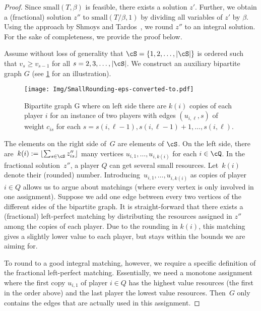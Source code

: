 \documentclass[a4paper,USenglish,cleveref,thm-restate]{lipics-v2021}
\begin{document}
\begin{proof}
    Since $\mathrm{small}(T, \beta)$ is feasible, there exists a solution $z'$.
    Further, we obtain a (fractional) solution $z''$ to $\mathrm{small}(T/\beta, 1)$ 
    by dividing all variables of $z'$ by $\beta$.
    Using the approach by Shmoys and Tardos~\cite{ShmoysT93},
    we round $z''$ to an integral solution.
    For the sake of completeness, we provide the proof below.

    Assume without loss of generality that $\cS = \{1,2,\dotsc,|\cS|\}$ is ordered such that $v_s \ge v_{s-1}$ for all $s=2,3,\dotsc,|\cS|$.
    We construct an auxiliary bipartite graph $G$ (see \cref{fig:smallRounding} for an illustration).
    \begin{figure}
        \centering
        \texttt{[image: Img/SmallRounding-eps-converted-to.pdf]}
        \caption{Bipartite graph G where on left side there are $k(i)$ copies of each player $i$ for an instance of two players with edges $(u_{i,\ell}, s)$ of weight $c_{is}$ for each $s = s(i,\ell-1),s(i,\ell-1)+1,\dotsc,s(i,\ell)$.} \label{fig:smallRounding}
    \end{figure}
    The elements
    on the right side of~$G$ are elements of
    $\cS$.
    On the left side, there are~$k(i) := \lfloor \sum_{s\in\cS} z''_{is} \rfloor$
    many vertices $u_{i, 1},\dotsc,u_{i,k(i)}$ for each
    $i\in\cQ$.
    In the fractional solution~$z''$, a player $Q$
    can get several small resources.
    Let~$k(i)$ denote their (rounded) number.
    Introducing~$u_{i,1},\dotsc,u_{i,k(i)}$ as
    copies of player $i\in Q$ allows us to argue about matchings
    (where every vertex is only involved in one assignment).
    Suppose we add one edge between every two vertices
    of the different sides of the bipartite graph.
    It is straight-forward that there exists a (fractional)
    left-perfect matching by distributing the resources
    assigned in $z''$ among
    the copies of each player.
    Due to the rounding in $k(i)$, this matching gives a slightly lower value to each player, but stays within the bounds we are aiming for.
    
    To round to a good integral matching, however, we require a specific definition of the
    fractional left-perfect matching.
    Essentially, we need a monotone assignment where
    the first copy $u_{i,1}$ of player $i\in Q$ has the highest value resources (the first in the order above) and the last player the lowest value resources.
    Then~$G$ only contains the edges that 
    are actually used in this assignment.


\end{proof}
\end{document}
